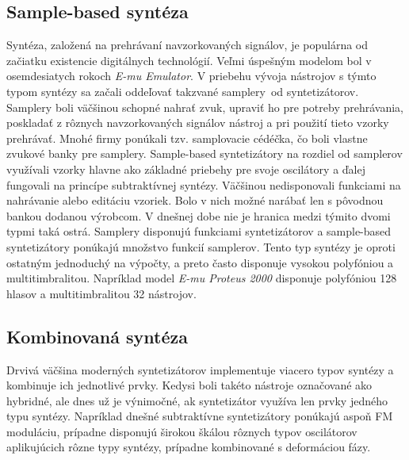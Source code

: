 \subsection{Sample-based syntéza}

Syntéza, založená na prehrávaní navzorkovaných signálov, je populárna od začiatku existencie digitálnych technológií. Veľmi úspešným modelom bol v osemdesiatych rokoch \emph{E-mu Emulator}. V priebehu vývoja nástrojov s týmto typom syntézy sa začali oddeľovať takzvané \bq samplery\eq\, od syntetizátorov. Samplery boli väčšinou schopné nahrať zvuk, upraviť ho pre potreby prehrávania, poskladať z rôznych navzorkovaných signálov nástroj a pri použití tieto vzorky prehrávať. Mnohé firmy ponúkali tzv. \bq samplovacie cédéčka\eq , čo boli vlastne zvukové banky pre samplery. Sample-based syntetizátory na rozdiel od samplerov využívali vzorky hlavne ako základné priebehy pre svoje oscilátory a ďalej fungovali na princípe subtraktívnej syntézy. Väčšinou nedisponovali funkciami na nahrávanie alebo editáciu vzoriek. Bolo v nich možné narábať len s pôvodnou bankou dodanou výrobcom. V dnešnej dobe nie je hranica medzi týmito dvomi typmi taká ostrá. Samplery disponujú funkciami syntetizátorov a sample-based syntetizátory ponúkajú množstvo funkcií samplerov. Tento typ syntézy je oproti ostatným jednoduchý na výpočty, a preto často disponuje vysokou polyfóniou a multitimbralitou. Napríklad model \emph{E-mu Proteus 2000} disponuje polyfóniou 128 hlasov a multitimbralitou 32 nástrojov.

\subsection{Kombinovaná syntéza}

Drvivá väčšina moderných syntetizátorov implementuje viacero typov syntézy a kombinuje ich jednotlivé prvky. Kedysi boli takéto nástroje označované ako \bq hybridné\eq , ale dnes už je výnimočné, ak syntetizátor využíva len prvky jedného typu syntézy. Napríklad dnešné subtraktívne syntetizátory ponúkajú aspoň FM moduláciu, prípadne disponujú širokou škálou rôznych typov oscilátorov aplikujúcich rôzne typy syntézy, prípadne kombinované s deformáciou fázy.